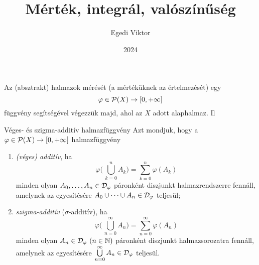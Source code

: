\documentclass[
]{elteikthesis}[2024/04/26]
\title{Mérték, integrál, valószínűség} %
\date{2024} %
\author{Egedi Viktor}
\affiliation{egyetemi tanár} %
\begin{document}
	
	
	Az (absztrakt) halmazok mérését (a mértéküknek az értelmezését) egy
	\[
		\varphi \in \mathcal{P}( X ) \to [0, +\infty]
	\]
	függvény segítségével végezzük majd, ahol az \( X \) adott alaphalmaz.
	Il
	
	\begin{definition}{Véges- és szigma-additív halmazfüggvény}{}
		Azt mondjuk, hogy a \( \varphi \in \mathcal{P}( X ) \to [0, +\infty] \) halmazfüggvény
		\begin{enumerate}
			\item \emph{(véges) additív}, ha
			\[
				\varphi \Biggl(\, \bigcup_{k=0}^n A_k \Biggr) = \sum_{k=0}^n \varphi(A_k)
			\]
			minden olyan \( A_0, \dots, A_n \in \mathcal{D}_{\varphi} \) páronként diszjunkt halmazrendszerre fennáll, amelynek az egyesítésére
			\( A_0 \cup \cdots \cup A_n \in \mathcal{D}_{\varphi} \) teljesül;
			
			\item \emph{szigma-additív} (\( \sigma \)-additív), ha
			\[
				\varphi \Biggl(\, \bigcup_{n=0}^\infty A_n \Biggr) = 
				\sum_{n=0}^\infty \varphi(A_n)
			\]
			minden olyan \( A_n \in \mathcal{D}_{\varphi} \ (n \in \mathbb{N}) \) páronként diszjunkt halmazsorozatra fennáll, amelynek az egyesítésére 
			\( \bigcup\limits_{n=0}^{\infty} A_n \in \mathcal{D}_{\varphi} \) teljesül.
		\end{enumerate}
	\end{definition}
	
\end{document}

